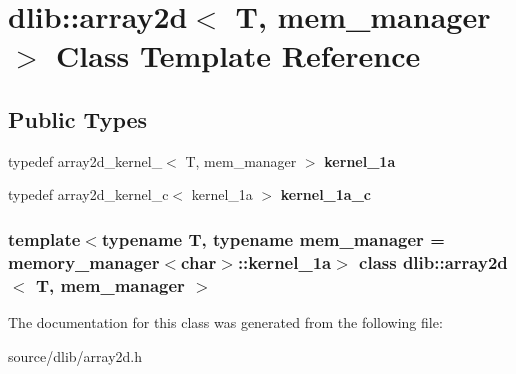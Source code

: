\hypertarget{classdlib_1_1array2d}{
\section{dlib::array2d$<$ T, mem\_\-manager $>$ Class Template Reference}
\label{classdlib_1_1array2d}
}
\subsection*{Public Types}
\begin{DoxyCompactItemize}
\item 
\hypertarget{classdlib_1_1array2d_a2c111db63374b88dae1b67cbe13af120}{
typedef array2d\_\-kernel\_$<$ T, mem\_\-manager $>$ {\bfseries kernel\_\-1a}}
\label{classdlib_1_1array2d_a2c111db63374b88dae1b67cbe13af120}

\item 
\hypertarget{classdlib_1_1array2d_a002e42285ca5401721ec363c2b723217}{
typedef array2d\_\-kernel\_\-c$<$ kernel\_\-1a $>$ {\bfseries kernel\_\-1a\_\-c}}
\label{classdlib_1_1array2d_a002e42285ca5401721ec363c2b723217}

\end{DoxyCompactItemize}
\subsubsection*{template$<$typename T, typename mem\_\-manager = memory\_\-manager$<$char$>$::kernel\_\-1a$>$ class dlib::array2d$<$ T, mem\_\-manager $>$}



The documentation for this class was generated from the following file:\begin{DoxyCompactItemize}
\item 
source/dlib/array2d.h\end{DoxyCompactItemize}
